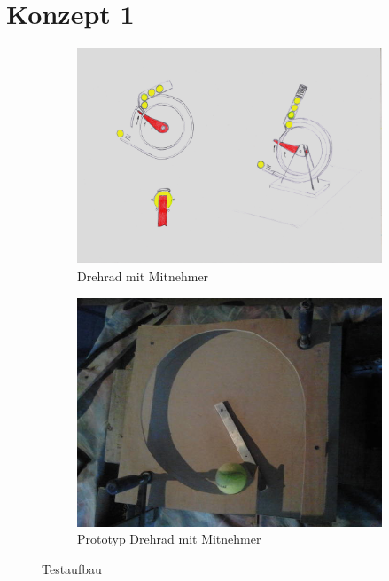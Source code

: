 \section{Konzept 1}

\begin{figure}[h!]
	\centering
	\begin{subfigure}[b]{0.45\textwidth}
		\includegraphics[width=\textwidth]{../../fig/Drehrad_Mitnehmer.jpg}
		\caption{Drehrad mit Mitnehmer}
	\end{subfigure}
	\begin{subfigure}[b]{0.45\textwidth}
		\includegraphics[width=\textwidth]{../../fig/prototyp_propeller.jpg}
		\caption{Prototyp Drehrad mit Mitnehmer}
	\end{subfigure}
	\caption{Testaufbau}
	\label{fig:drehrad_mitnehmer}
\end{figure}


